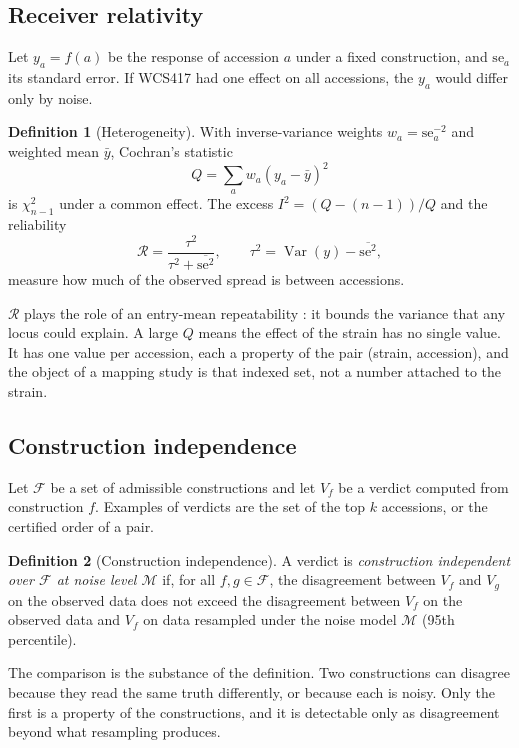\documentclass[10pt,twocolumn,a4paper]{article}
\theoremstyle{definition}
\newtheorem{definition}{Definition}[section]
\theoremstyle{remark}
\newcommand{\Var}{\operatorname{Var}}
\newcommand{\se}{\mathrm{se}}
\begin{document}
\subsection{Receiver relativity}
\label{sec:relativity}

Let $y_a=f(a)$ be the response of accession $a$ under a fixed
construction, and $\se_a$ its standard error. If WCS417 had one effect
on all accessions, the $y_a$ would differ only by noise.

\begin{definition}[Heterogeneity]
\label{def:het}
With inverse-variance weights $w_a=\se_a^{-2}$ and weighted mean $\bar y$,
Cochran's statistic \citep{cochran1954}
\[
  Q=\sum_a w_a(y_a-\bar y)^2
\]
is $\chi^2_{n-1}$ under a common effect. The excess
$I^2=(Q-(n-1))/Q$ \citep{higgins2002} and the reliability
\[
  \mathcal R=\frac{\tau^2}{\tau^2+\overline{\se^2}},\qquad
  \tau^2=\Var(y)-\overline{\se^2},
\]
measure how much of the observed spread is between accessions.
\end{definition}

$\mathcal R$ plays the role of an entry-mean repeatability
\citep{falconer1996,lynch1998}: it bounds the variance that any locus
could explain. A large $Q$ means the effect of the strain has no single
value. It has one value per accession, each a property of the pair
(strain, accession), and the object of a mapping study is that indexed
set, not a number attached to the strain.

\subsection{Construction independence}
\label{sec:independence}

Let $\mathcal F$ be a set of admissible constructions and let $V_f$ be a
verdict computed from construction $f$. Examples of verdicts are the set
of the top $k$ accessions, or the certified order of a pair.

\begin{definition}[Construction independence]
\label{def:ci}
A verdict is \emph{construction independent over $\mathcal F$ at noise
level $\mathcal M$} if, for all $f,g\in\mathcal F$, the disagreement
between $V_f$ and $V_g$ on the observed data does not exceed the
disagreement between $V_f$ on the observed data and $V_f$ on data
resampled under the noise model $\mathcal M$ (95th percentile).
\end{definition}

The comparison is the substance of the definition. Two constructions can
disagree because they read the same truth differently, or because each
is noisy. Only the first is a property of the constructions, and it is
detectable only as disagreement beyond what resampling produces.
\end{document}
